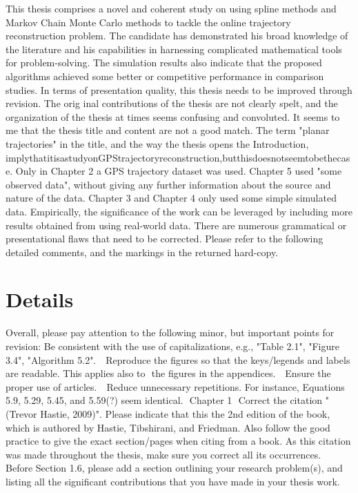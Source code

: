 \documentclass[a4paper,18pt]{extarticle}
\begin{document}
This thesis comprises a novel and coherent study on using spline methods and Markov Chain Monte Carlo methods to tackle the online trajectory reconstruction problem. The candidate has demonstrated his broad knowledge of the literature and his capabilities in harnessing complicated mathematical tools for problem-solving. The simulation results also indicate that the proposed algorithms achieved some better or competitive performance in comparison studies.
In terms of presentation quality, this thesis needs to be improved through revision. The orig­ inal contributions of the thesis are not clearly spelt, and the organization of the thesis at times seems confusing and convoluted. It seems to me that the thesis title and content are not a good match. The term "planar trajectories" in the title, and the way the thesis opens the Introduction, implythatitisastudyonGPStrajectoryreconstruction,butthisdoesnotseemtobethecase. Only in Chapter 2 a GPS trajectory dataset was used. Chapter 5 used "some observed data", without giving any further information about the source and nature of the data. Chapter 3 and Chapter 4 only used some simple simulated data. Empirically, the significance of the work can be leveraged by including more results obtained from using real-world data.
There are numerous grammatical or presentational flaws that need to be corrected. Please refer to the following detailed comments, and the markings in the returned hard-copy.

\section{Details}

Overall, please pay attention to the following minor, but important points for revision: 
 Be consistent with the use of capitalizations, e.g., "Table 2.1", "Figure 3.4", "Algorithm 5.2".  
 Reproduce the figures so that the keys/legends and labels are readable. This applies also to  the figures in the appendices.  
 Ensure the proper use of articles.  
 Reduce unnecessary repetitions. For instance, Equations 5.9, 5.29, 5.45, and 5.59(?) seem iden­tical.  Chapter 1  Correct the citation "(Trevor Hastie, 2009)". Please indicate that this the 2nd edition of the book, which is authored by Hastie, Tibshirani, and Friedman. Also follow the good practice to give the exact section/pages when citing from a book. As this citation was made throughout the thesis, make sure you correct all its occurrences.  Before Section 1.6, please add a section outlining your research problem(s), and listing all the significant contributions that you have made in your thesis work.  
\end{document}
